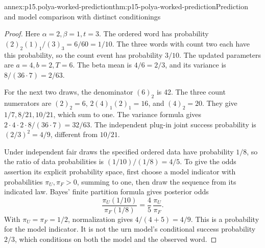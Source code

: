 \begin{annexitem}{annex:p15.polya-worked-prediction}{thm:p15-polya-worked-prediction}{Prediction and model comparison with distinct conditionings}
\begin{proof}
Here \(\alpha=2,\beta=1,t=3\). The ordered word has probability
\((2)_2(1)_1/(3)_3=6/60=1/10\).
The three words with count two each have this probability, so the
count event has probability \(3/10\).
The updated parameters are \(a=4,b=2,T=6\).
The beta mean is \(4/6=2/3\), and its variance is
\(8/(36\cdot7)=2/63\).

For the next two draws, the denominator \((6)_2\) is 42.
The three count numerators are \((2)_2=6\),
\(2(4)_1(2)_1=16\), and \((4)_2=20\).
They give \(1/7,8/21,10/21\), which sum to one.
The variance formula gives
\(2\cdot4\cdot2\cdot8/(36\cdot7)=32/63\).
The independent plug-in joint success probability is
\((2/3)^2=4/9\), different from \(10/21\).

Under independent fair draws the specified ordered data have probability
\(1/8\), so the ratio of data probabilities is
\((1/10)/(1/8)=4/5\).
To give the odds assertion its explicit probability space, first choose
a model indicator with probabilities \(\pi_U,\pi_F>0\), summing to one,
then draw the sequence from its indicated law. Bayes' finite partition
formula gives posterior odds
\[
       \frac{\pi_U(1/10)}{\pi_F(1/8)}
                    =\frac45\,\frac{\pi_U}{\pi_F}.
\]
With \(\pi_U=\pi_F=1/2\), normalization gives \(4/(4+5)=4/9\).
This is a probability for the model indicator. It is not the urn
model's conditional success probability \(2/3\), which conditions
on both the model and the observed word.
\end{proof}
\end{annexitem}

